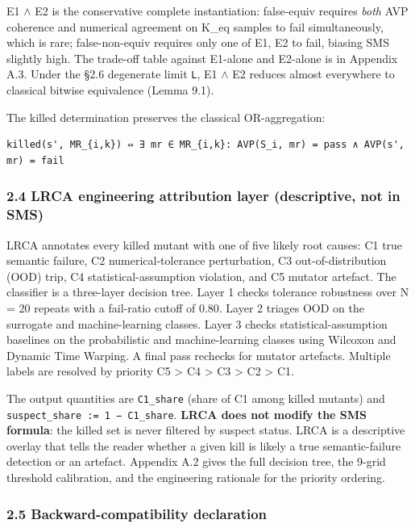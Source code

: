 \documentclass[review,12pt,authoryear]{elsarticle}
\begin{document}
E1 $\wedge$ E2 is the conservative complete instantiation: false-equiv requires
\emph{both} AVP coherence and numerical agreement on K\_eq samples to
fail simultaneously, which is rare; false-non-equiv requires only one of
E1, E2 to fail, biasing SMS slightly high. The trade-off table against
E1-alone and E2-alone is in Appendix A.3. Under the §2.6 degenerate
limit \texttt{L}, E1 $\wedge$ E2 reduces almost everywhere to classical bitwise
equivalence (Lemma 9.1).

The killed determination preserves the classical OR-aggregation:

\begin{verbatim}
killed(s', MR_{i,k}) ⇔ ∃ mr ∈ MR_{i,k}: AVP(S_i, mr) = pass ∧ AVP(s', mr) = fail
\end{verbatim}

\subsubsection{2.4 LRCA engineering attribution layer (descriptive, not
in
SMS)}\label{lrca-engineering-attribution-layer-descriptive-not-in-sms}

LRCA annotates every killed mutant with one of five likely root causes:
C1 true semantic failure, C2 numerical-tolerance perturbation, C3
out-of-distribution (OOD) trip, C4 statistical-assumption violation, and
C5 mutator artefact. The classifier is a three-layer decision tree.
Layer 1 checks tolerance robustness over N = 20 repeats with a
fail-ratio cutoff of 0.80. Layer 2 triages OOD on the surrogate and
machine-learning classes. Layer 3 checks statistical-assumption
baselines on the probabilistic and machine-learning classes using
Wilcoxon and Dynamic Time Warping. A final pass rechecks for mutator
artefacts. Multiple labels are resolved by priority C5 \textgreater{} C4
\textgreater{} C3 \textgreater{} C2 \textgreater{} C1.

The output quantities are \texttt{C1\_share} (share of C1 among killed
mutants) and \texttt{suspect\_share\ :=\ 1\ −\ C1\_share}. \textbf{LRCA
does not modify the SMS formula}: the killed set is never filtered by
suspect status. LRCA is a descriptive overlay that tells the reader
whether a given kill is likely a true semantic-failure detection or an
artefact. Appendix A.2 gives the full decision tree, the 9-grid
threshold calibration, and the engineering rationale for the priority
ordering.

\subsubsection{2.5 Backward-compatibility
declaration}\label{backward-compatibility-declaration}
\end{document}
